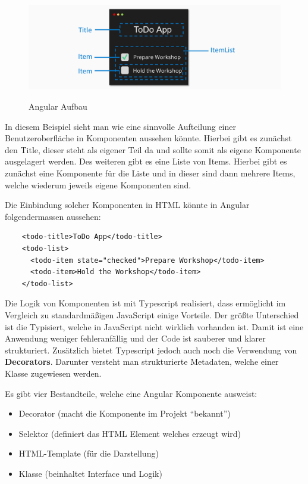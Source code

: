 \begin{figure}[h!]
    \centering
    \includegraphics[width=1\textwidth]{pics/angular-components.png }
    \caption{Angular Aufbau}
    \cite{frontend_web_angular_introduction}
    \label{fig:mesh1}
\end{figure}

In diesem Beispiel sieht man wie eine sinnvolle Aufteilung einer Benutzeroberfläche in Komponenten aussehen könnte. Hierbei gibt es zunächst den Title, dieser steht als eigener Teil da und sollte somit als eigene Komponente ausgelagert werden. Des weiteren gibt es eine Liste von Items. Hierbei gibt es zunächst eine Komponente für die Liste und in dieser sind dann mehrere Items, welche wiederum jeweils eigene Komponenten sind. 

Die Einbindung solcher Komponenten in HTML könnte in Angular folgendermassen aussehen:

\begin{lstlisting}
    <todo-title>ToDo App</todo-title>
    <todo-list>
      <todo-item state="checked">Prepare Workshop</todo-item>
      <todo-item>Hold the Workshop</todo-item>
    </todo-list>
\end{lstlisting}

Die Logik von Komponenten ist mit Typescript realisiert, dass ermöglicht im Vergleich zu standardmäßigen JavaScript einige Vorteile. Der größte Unterschied ist die Typisiert, welche in JavaScript nicht wirklich vorhanden ist. Damit ist eine Anwendung weniger fehleranfällig und der Code ist sauberer und klarer strukturiert. Zusätzlich bietet Typescript jedoch auch noch die Verwendung von \textbf{Decorators}. Darunter versteht man strukturierte Metadaten, welche einer Klasse zugewiesen werden. 

Es gibt vier Bestandteile, welche eine Angular Komponente ausweist:

\begin{itemize}
    \item Decorator (macht die Komponente im Projekt “bekannt”)
    \item Selektor (definiert das HTML Element welches erzeugt wird)
    \item HTML-Template (für die Darstellung)
    \item Klasse (beinhaltet Interface und Logik)
\end{itemize}

